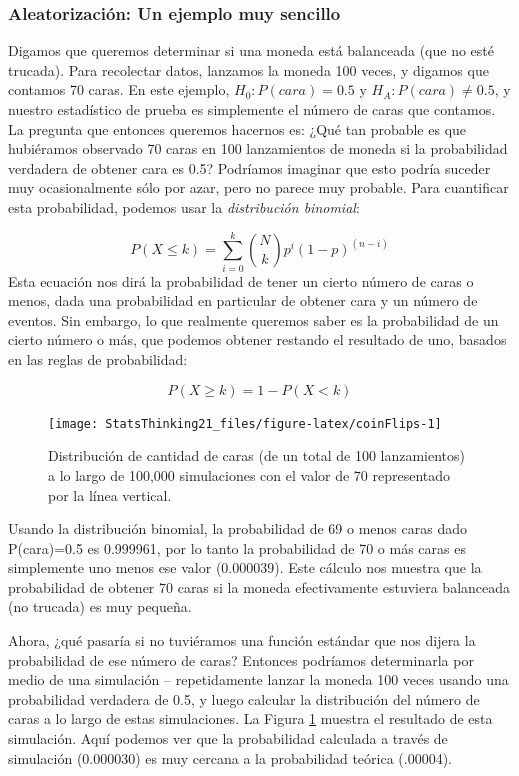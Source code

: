 \documentclass[
  12pt,
]{book}
\begin{document}
\hypertarget{randomization-very-simple}{%
\subsubsection{Aleatorización: Un ejemplo muy sencillo}\label{randomization-very-simple}}

Digamos que queremos determinar si una moneda está balanceada (que no esté trucada). Para recolectar datos, lanzamos la moneda 100 veces, y digamos que contamos 70 caras. En este ejemplo, \(H_0: P(cara)=0.5\) y \(H_A: P(cara) \neq 0.5\), y nuestro estadístico de prueba es simplemente el número de caras que contamos. La pregunta que entonces queremos hacernos es: ¿Qué tan probable es que hubiéramos observado 70 caras en 100 lanzamientos de moneda si la probabilidad verdadera de obtener cara es 0.5? Podríamos imaginar que esto podría suceder muy ocasionalmente sólo por azar, pero no parece muy probable. Para cuantificar esta probabilidad, podemos usar la \emph{distribución binomial}:

\[
P(X \le k) = \sum_{i=0}^k \binom{N}{k} p^i (1-p)^{(n-i)}
\]
Esta ecuación nos dirá la probabilidad de tener un cierto número de caras o menos, dada una probabilidad en particular de obtener cara y un número de eventos. Sin embargo, lo que realmente queremos saber es la probabilidad de un cierto número o más, que podemos obtener restando el resultado de uno, basados en las reglas de probabilidad:

\[
P(X \ge k) = 1 - P(X < k)
\]

\begin{figure}
\texttt{[image: StatsThinking21\_files/figure-latex/coinFlips-1]} \caption{Distribución de cantidad de caras (de un total de 100 lanzamientos) a lo largo de 100,000 simulaciones  con el valor de 70 representado por la línea vertical.}\label{fig:coinFlips}
\end{figure}

Usando la distribución binomial, la probabilidad de 69 o menos caras dado P(cara)=0.5 es 0.999961, por lo tanto la probabilidad de 70 o más caras es simplemente uno menos ese valor (0.000039).
Este cálculo nos muestra que la probabilidad de obtener 70 caras si la moneda efectivamente estuviera balanceada (no trucada) es muy pequeña.

Ahora, ¿qué pasaría si no tuviéramos una función estándar que nos dijera la probabilidad de ese número de caras? Entonces podríamos determinarla por medio de una simulación -- repetidamente lanzar la moneda 100 veces usando una probabilidad verdadera de 0.5, y luego calcular la distribución del número de caras a lo largo de estas simulaciones. La Figura \ref{fig:coinFlips} muestra el resultado de esta simulación. Aquí podemos ver que la probabilidad calculada a través de simulación (0.000030) es muy cercana a la probabilidad teórica (.00004).
\end{document}
